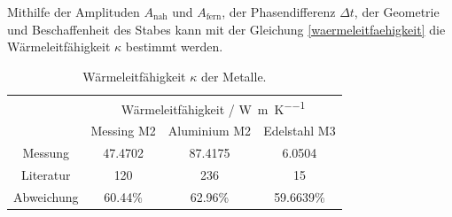 Mithilfe der Amplituden $A_{\text{nah}}$ und $A_{\text{fern}}$, der Phasendifferenz $\Delta t$, der Geometrie und Beschaffenheit des Stabes kann mit der Gleichung \eqref{waermeleitfaehigkeit} die Wärmeleitfähigkeit $\kappa$ bestimmt werden.
\begin{table}[htbp]
	\centering
	\begin{tabular}{cccc}
	\toprule
	&\multicolumn{3}{c}{Wärmeleitfähigkeit \kappa \:/ \:\si{\watt\per\meter\per\kelvin}}\\
	&{Messing M2}&{Aluminium M2}&{Edelstahl M3}\\
	\midrule
	{Messung}&{47.4702}& 87.4175&6.0504\\
	{Literatur}&{120}&{236}&15\\
	\midrule
	{Abweichung}&60.44\%&62.96\%&59.6639\%\\
	\bottomrule
	\end{tabular}
	\caption{Wärmeleitfähigkeit $\kappa$ der Metalle.}
\label{tab:waermeleitfaehigkeitwerte}
\end{table}
